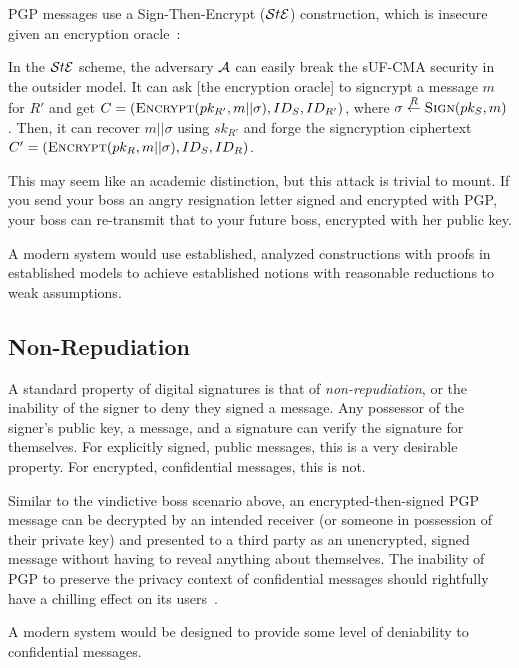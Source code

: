 PGP messages use a Sign-Then-Encrypt ($\mathcal{S}t\mathcal{E}$) construction, which is insecure given an encryption
oracle~\cite[p. 41]{an2010}\@:

\begin{displayquote}
    In the $\mathcal{S}t\mathcal{E}$ scheme, the adversary $\mathcal{A}$ can easily break the sUF-CMA security in the
    outsider model. It can ask \@[the encryption oracle] to signcrypt a message $m$ for $R'$ and get
    $C=(\textsc{Encrypt}(pk_{R'},m||\sigma),ID_S,ID_{R'})$, where $\sigma \stackrel{R}{\gets}
        \textsc{Sign}(pk_S,m)$. Then, it can recover $m||\sigma$ using $sk_{R'}$ and forge the
    signcryption ciphertext $C' = (\textsc{Encrypt}(pk_R,m||\sigma),ID_S,ID_R)$.
\end{displayquote}

This may seem like an academic distinction, but this attack is trivial to mount. If you send your
boss an angry resignation letter signed and encrypted with PGP, your boss can re-transmit that to
your future boss, encrypted with her public key.

A modern system would use established, analyzed constructions with proofs in established models to
achieve established notions with reasonable reductions to weak assumptions.

\subsection{Non-Repudiation}\label{subsec:non-repudiation}

A standard property of digital signatures is that of \emph{non-repudiation}\@, or the inability of
the signer to deny they signed a message. Any possessor of the signer's public key, a message, and a
signature can verify the signature for themselves. For explicitly signed, public messages, this is a
very desirable property. For encrypted, confidential messages, this is not.

Similar to the vindictive boss scenario above, an encrypted-then-signed PGP message can be decrypted
by an intended receiver \@(or someone in possession of their private key) and presented to a third
party as an unencrypted, signed message without having to reveal anything about themselves. The
inability of PGP to preserve the privacy context of confidential messages should rightfully have a
chilling effect on its users~\cite{borisov2004}\@.

A modern system would be designed to provide some level of deniability to confidential messages.

